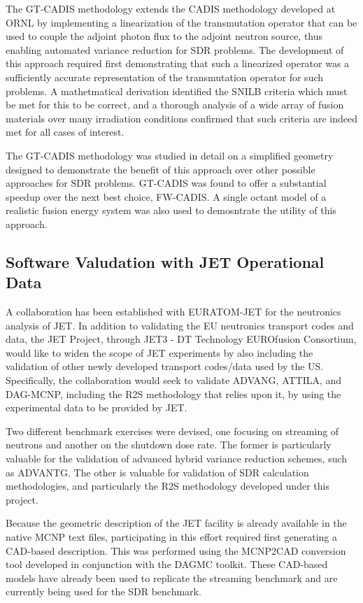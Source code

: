 The \gls{GT-CADIS} methodology extends the \gls{CADIS} methodology developed
at \gls{ORNL} by implementing a linearization of the transmutation operator
that can be used to couple the adjoint photon flux to the adjoint neutron
source, thus enabling automated variance reduction for \gls{SDR} problems.
The development of this approach required first demonstrating that such a
linearized operator was a sufficiently accurate representation of the
transmutation operator for such problems.  A mathetmatical derivation
identified the \gls{SNILB} criteria which must be met for this to be correct,
and a thorough analysis of a wide array of fusion materials over many
irradiation conditions confirmed that such criteria are indeed met for all
cases of interest.

The \gls{GT-CADIS} methodology was studied in detail on a simplified geometry
designed to demonstrate the benefit of this approach over other possible
approaches for \gls{SDR} problems.  \gls{GT-CADIS} was found to offer a
substantial speedup over the next best choice, \gls{FW-CADIS}.  A single
octant model of a realistic fusion energy system was also used to demosntrate
the utility of this approach.

\subsection{Software Valudation with JET Operational Data}

A collaboration has been established with EURATOM-JET for the neutronics
analysis of JET.  In addition to validating the EU neutronics transport codes
and data, the JET Project, through JET3 - DT Technology EUROfusion Consortium,
would like to widen the scope of JET experiments by also including the
validation of other newly developed transport codes/data used by the US.
Specifically, the collaboration would seek to validate ADVANG, ATTILA, and
DAG-MCNP, including the \gls{R2S} methodology that relies upon it, by using
the experimental data to be provided by JET.

Two different benchmark exercises were devised, one focusing on streaming of
neutrons and another on the shutdown dose rate.  The former is particularly
valuable for the validation of advanced hybrid variance reduction schemes,
such as ADVANTG.  The other is valuable for validation of \gls{SDR}
calculation methodologies, and particularly the \gls{R2S} methodology
developed under this project.

Because the geometric description of the JET facility is already available in
the native MCNP text files, participating in this effort required first
generating a \gls{CAD}-based description.  This was performed using the
MCNP2CAD conversion tool developed in conjunction with the \gls{DAGMC}
toolkit.  These \gls{CAD}-based models have already been used to replicate the
streaming benchmark and are currently being used for the \gls{SDR} benchmark.

